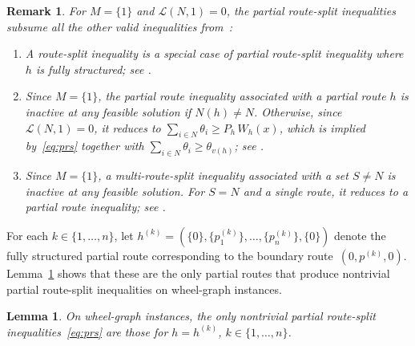 \documentclass{article}
\newtheorem{lemma}{Lemma}
\newtheorem{remark}{Remark}
\begin{document}
{\begin{remark}\label{rem:subsumption}
For $M=\{1\}$ and $\mathcal{L}(N,1) = 0$, the partial route-split inequalities subsume all the other valid inequalities from~\cite{hoogendoorn2023improved}:
\begin{enumerate}\renewcommand{\labelenumi}{(\roman{enumi})}
  \item A \emph{route-split inequality} \cite[equation~(15)]{hoogendoorn2023improved} is a special case of partial route-split inequality where $h$ is fully structured; see \cite[Section~5.1]{hoogendoorn2023improved}.
  \item Since $M=\{1\}$, the \emph{partial route inequality} \cite[equation~(12)]{hoogendoorn2023improved} associated with a partial route $h$ is inactive at any feasible solution if $N(h)\neq N$. Otherwise, since $\mathcal{L}(N,1) = 0$, it reduces to $\sum_{i \in N}\theta_i \geq P_h\, W_h(x)$, which is implied by~\eqref{eq:prs} together with $\sum_{i \in N}\theta_i \geq \theta_{v(h)}$; see \cite[Section~5.2]{hoogendoorn2023improved}.
  \item Since $M=\{1\}$, a \emph{multi-route-split inequality} \cite[equation~(18)]{hoogendoorn2023improved} associated with a set $S \neq N$ is inactive at any feasible solution. For $S = N$ and a single route, it reduces to a partial route inequality; see \cite[Section~5.3]{hoogendoorn2023improved}.
\end{enumerate}
\end{remark}

For each $k \in \{1,\dots,n\}$, let $h^{(k)} = (\{0\}, \{p^{(k)}_1\}, \ldots, \{p^{(k)}_n\}, \{0\})$ denote the fully structured partial route corresponding to the boundary route~$(0,p^{(k)},0)$. Lemma~\ref{lem:prs-characterization} shows that these are the only partial routes that produce nontrivial partial route-split inequalities on wheel-graph instances.

\begin{lemma}\label{lem:prs-characterization}
On wheel-graph instances, the only nontrivial partial route-split inequalities~\eqref{eq:prs} are those for $h = h^{(k)}$, $k \in \{1,\dots,n\}$.
\end{lemma}

}
\end{document}
